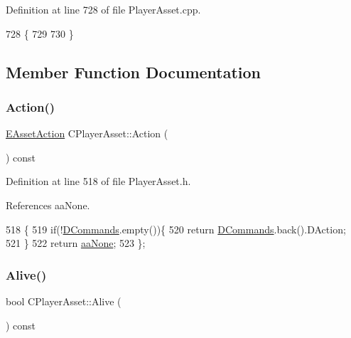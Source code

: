 Definition at line 728 of file Player\+Asset.\+cpp.


\begin{DoxyCode}
728                            \{
729     
730 \}
\end{DoxyCode}


\subsection{Member Function Documentation}
\hypertarget{classCPlayerAsset_ad9a1fdc2ca221636ccab01891ea1f951}{}\label{classCPlayerAsset_ad9a1fdc2ca221636ccab01891ea1f951} 
\subsubsection{\texorpdfstring{Action()}{Action()}}
{\footnotesize\ttfamily \hyperlink{GameDataTypes_8h_ab47668e651a3032cfb9c40ea2d60d670}{E\+Asset\+Action} C\+Player\+Asset\+::\+Action (\begin{DoxyParamCaption}{ }\end{DoxyParamCaption}) const\hspace{0.3cm}{\ttfamily [inline]}}



Definition at line 518 of file Player\+Asset.\+h.



References aa\+None.


\begin{DoxyCode}
518                                    \{
519             \textcolor{keywordflow}{if}(!\hyperlink{classCPlayerAsset_a4d3b96106d3b1c1020f98005884d2a87}{DCommands}.empty())\{
520                 \textcolor{keywordflow}{return} \hyperlink{classCPlayerAsset_a4d3b96106d3b1c1020f98005884d2a87}{DCommands}.back().DAction;
521             \}
522             \textcolor{keywordflow}{return} \hyperlink{GameDataTypes_8h_ab47668e651a3032cfb9c40ea2d60d670ac17cc5a0035320c060d7f8074143b507}{aaNone};
523         \};
\end{DoxyCode}
\hypertarget{classCPlayerAsset_a616d6139b57b9e74cca2559d7501ad3e}{}\label{classCPlayerAsset_a616d6139b57b9e74cca2559d7501ad3e} 
\subsubsection{\texorpdfstring{Alive()}{Alive()}}
{\footnotesize\ttfamily bool C\+Player\+Asset\+::\+Alive (\begin{DoxyParamCaption}{ }\end{DoxyParamCaption}) const\hspace{0.3cm}{\ttfamily [inline]}}



